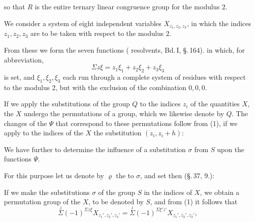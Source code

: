 
so that $R$ is the entire ternary linear congruence group for the modulus 2.

We consider a system of eight independent variables $X_{z_1,z_2,z_3}$, in which the indices $z_1, z_2, z_3$ are to be taken with respect to the modulus 2.

From these we form the seven functions ( resolvents, Bd.\,I, \S.\,164).
in which, for abbreviation,
\[
\Sigma z\xi = z_1\xi_1 + z_2\xi_2 + z_3\xi_3
\]
is set, and $\xi_1, \xi_2, \xi_3$ each run through a complete system of residues with respect to the modulus 2, but with the exclusion of the combination $0, 0, 0$.

If we apply the substitutions of the group $Q$ to the indices $z_i$ of the quantities $X$, the $X$ undergo the permutations of a group, which we likewise denote by $Q$. The changes of the $\Psi$ that correspond to these permutations follow from (1), if we apply to the indices of the $X$ the substitution $(z_i, z_i+h)$:


We have further to determine the influence of a substitution $\sigma$ from $S$ upon the functions $\Psi$.

For this purpose let us denote by $\varrho$ the  to $\sigma$, and set
then (\S.\,37, 9.):

If we make the substitutions $\sigma$ of the group $S$ in the indices of $X$, we obtain a permutation group of the $X$, to be denoted by $S$, and from (1) it follows that
\[
\overset{z}{\Sigma} (-1)^{\Sigma z\xi} X_{z_1', z_2', z_3'} = \overset{z}{\Sigma} (-1)^{\Sigma \xi' z'} X_{z_1', z_2', z_3'},
\]
